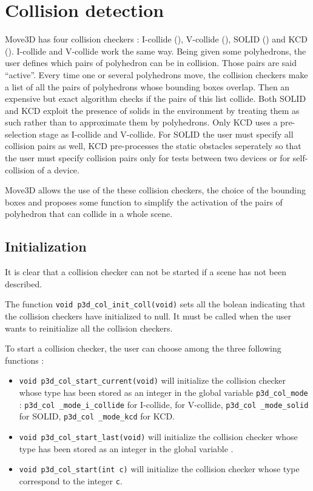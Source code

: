 \chapter{Collision detection}

Move3D has four collision checkers : I-collide  (\cite{LINMANOCH95}),
V-collide (\cite{LINMANOCH97}), SOLID (\cite{SOLID}) and KCD
(\cite{KCD}). I-collide and V-collide work the same way. Being
given some polyhedrons, the user defines which pairs of polyhedron can
be in collision. Those pairs are said ``activ{e}''. Every time one or
several polyhedrons move, the collision checkers make a list of all
the pairs of polyhedrons whose bounding boxes overlap. Then an
expensive but exact algorithm checks if the pairs of this list
collide. Both SOLID and KCD exploit the presence of solids in the 
environment by treating them as such rather than to approximate them
by polyhedrons. Only KCD uses a pre-selection stage as I-collide and
V-collide. For SOLID the user must specify all collision pairs as
well, KCD pre-processes the static obstacles seperately so that the
user must specify collision pairs only for tests between two devices
or for self-collision of a device.

Move3D allows the use of the these collision checkers, the choice of the
bounding boxes and proposes some function to simplify the activation
of the pairs of polyhedron that can collide in a whole scene.

\section{Initialization}

It is clear that a collision checker can not be started if a scene has
not been described.

The function {\tt void p3d\_col\_init\_coll(void)}
 sets all the
bolean indicating that the collision checkers have initialized to
null. It must be called when the user wants to reinitialize all the
collision checkers.

To start a collision checker, the user can choose among the three
following functions :

\begin{itemize}
\item {\tt void p3d\_col\_start\_current(void)}
 will initialize
the collision checker whose type has been stored as an integer in the global
variable {\tt p3d\_col\_mode} : {\tt p3d\_col \_mode\_i\_collide} for
I-collide,  for V-collide, 
{\tt p3d\_col \_mode\_solid} for SOLID, {\tt p3d\_col \_mode\_kcd} for KCD.
\item {\tt void p3d\_col\_start\_last(void)}
 will initialize
the collision checker whose type has been stored as an integer in the global
variable .
\item {\tt void p3d\_col\_start(int c)}  will initialize
the collision checker whose type correspond to the integer {\tt c}.
\end{itemize}

